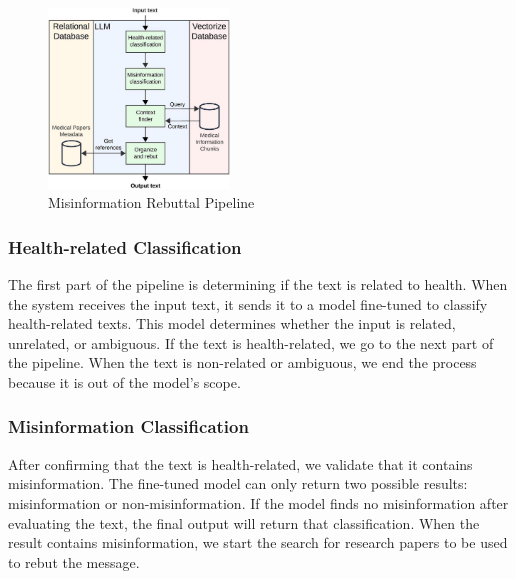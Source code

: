 \begin{figure}[h]
	\begin{center}
		\includegraphics[width=0.43\textwidth]{figures/LLM_Pipeline.jpeg} %
	\end{center}
	\caption{Misinformation Rebuttal Pipeline} %
	\label{fig:llm}
\end{figure}


\subsubsection{Health-related Classification}
The first part of the pipeline is determining if the text is related to health. When the system receives the input text, it sends it to a model fine-tuned to classify health-related texts. This model determines whether the input is related, unrelated, or ambiguous.
If the text is health-related, we go to the next part of the pipeline. When the text is non-related or ambiguous, we end the process because it is out of the model's scope. 

\subsubsection{Misinformation Classification}
After confirming that the text is health-related, we validate that it contains misinformation. The fine-tuned model can only return two possible results: misinformation or non-misinformation. If the model finds no misinformation after evaluating the text,
the final output will return that classification. When the result contains misinformation, we start the search for research papers to be used to rebut the message.

